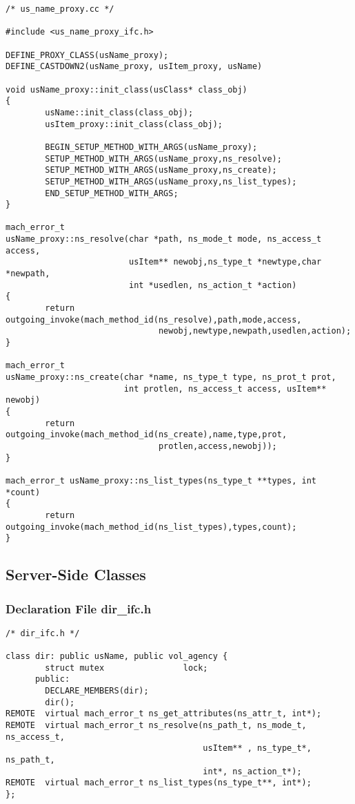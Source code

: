 {\footnotesize
\begin{verbatim}
/* us_name_proxy.cc */

#include <us_name_proxy_ifc.h>

DEFINE_PROXY_CLASS(usName_proxy);
DEFINE_CASTDOWN2(usName_proxy, usItem_proxy, usName)

void usName_proxy::init_class(usClass* class_obj)
{
        usName::init_class(class_obj);
        usItem_proxy::init_class(class_obj);

        BEGIN_SETUP_METHOD_WITH_ARGS(usName_proxy);
        SETUP_METHOD_WITH_ARGS(usName_proxy,ns_resolve);
        SETUP_METHOD_WITH_ARGS(usName_proxy,ns_create);
        SETUP_METHOD_WITH_ARGS(usName_proxy,ns_list_types);
        END_SETUP_METHOD_WITH_ARGS;
}

mach_error_t 
usName_proxy::ns_resolve(char *path, ns_mode_t mode, ns_access_t access, 
                         usItem** newobj,ns_type_t *newtype,char *newpath, 
                         int *usedlen, ns_action_t *action)
{
        return outgoing_invoke(mach_method_id(ns_resolve),path,mode,access,
                               newobj,newtype,newpath,usedlen,action);
}

mach_error_t 
usName_proxy::ns_create(char *name, ns_type_t type, ns_prot_t prot, 
                        int protlen, ns_access_t access, usItem** newobj)
{
        return outgoing_invoke(mach_method_id(ns_create),name,type,prot,
                               protlen,access,newobj));
}

mach_error_t usName_proxy::ns_list_types(ns_type_t **types, int *count)
{
        return outgoing_invoke(mach_method_id(ns_list_types),types,count);
}
\end{verbatim}
}

\subsection{Server-Side Classes}
\label{dir}
\subsubsection{Declaration File dir\_ifc.h}

{\footnotesize
\begin{verbatim}
/* dir_ifc.h */

class dir: public usName, public vol_agency {
        struct mutex                lock;
      public:
        DECLARE_MEMBERS(dir);
        dir();
REMOTE  virtual mach_error_t ns_get_attributes(ns_attr_t, int*);
REMOTE  virtual mach_error_t ns_resolve(ns_path_t, ns_mode_t, ns_access_t, 
                                        usItem** , ns_type_t*, ns_path_t, 
                                        int*, ns_action_t*);
REMOTE  virtual mach_error_t ns_list_types(ns_type_t**, int*);
};
\end{verbatim}
}

